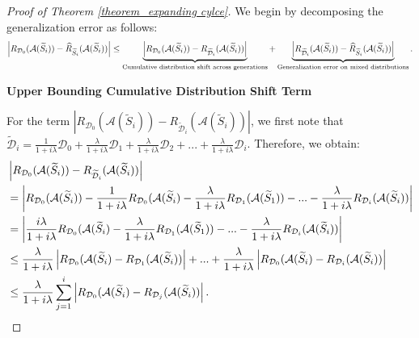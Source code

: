 \begin{proof}[Proof of Theorem \ref{theorem_expanding cylce}]
We begin by decomposing the generalization error as follows:
\begin{align}
\left|R_{\mathcal{D}_0}(\mathcal{A}(\widetilde{S}_i))-\widehat{R}_{\widetilde{S}_i}(\mathcal{A}(\widetilde{S}_i))\right| \leq \underbrace{\left|R_{\mathcal{D}_0}(\mathcal{A}(\widetilde{S}_i))-R_{\widetilde{\mathcal{D}}_i}(\mathcal{A}(\widetilde{S}_i))\right|}_{\text {Cumulative distribution shift across generations}}+\underbrace{\left| R_{\widetilde{\mathcal{D}}_i}(\mathcal{A}(\widetilde{S}_i))-\widehat{R}_{\widetilde{S}_i}(\mathcal{A}(\widetilde{S}_i)) \right|}_{\text {Generalization error on mixed distributions}}. \notag
\end{align}


\textbf{Upper Bounding Cumulative Distribution Shift Term}


For the term $\left|R_{\mathcal{D}_0}(\mathcal{A}(\widetilde{S}_i))-R_{\widetilde{\mathcal{D}}_i}(\mathcal{A}(\widetilde{S}_i))\right|$, we first note that $\widetilde{\mathcal{D}}_i=\frac{1}{1+i\lambda}\mathcal{D}_0+\frac{\lambda}{1+i\lambda} \mathcal{D}_1+\frac{\lambda}{1+i\lambda} \mathcal{D}_2+...+\frac{\lambda}{1+i\lambda} \mathcal{D}_i$. Therefore, we obtain:
\begin{align}
    &\left|R_{\mathcal{D}_0}(\mathcal{A}(\widetilde{S}_i))-R_{\widetilde{\mathcal{D}}_i}(\mathcal{A}(\widetilde{S}_i))\right|\notag \\
    &=\left|R_{\mathcal{D}_0}(\mathcal{A}(\widetilde{S}_i))-\frac{1}{1+i\lambda} R_{\mathcal{D}_0}(\mathcal{A}(\widetilde{S}_i)-\frac{\lambda}{1+i\lambda}R_{\mathcal{D}_1}(\mathcal{A}(\widetilde{S}_1))-...-\frac{\lambda}{1+i\lambda}R_{\mathcal{D}_i}(\mathcal{A}(\widetilde{S}_i))\right| \notag \\
    &=\left|\frac{i\lambda}{1+i\lambda} R_{\mathcal{D}_0}(\mathcal{A}(\widetilde{S}_i)-\frac{\lambda}{1+i\lambda}R_{\mathcal{D}_1}(\mathcal{A}(\widetilde{S}_1))-...-\frac{\lambda}{1+i\lambda}R_{\mathcal{D}_i}(\mathcal{A}(\widetilde{S}_i))\right| \notag \\
    &\leq \frac{\lambda}{1+i\lambda}\left|R_{\mathcal{D}_0}(\mathcal{A}(\widetilde{S}_i)-R_{\mathcal{D}_1}(\mathcal{A}(\widetilde{S}_i))\right|+...+\frac{\lambda}{1+i\lambda}\left|R_{\mathcal{D}_0}(\mathcal{A}(\widetilde{S}_i)-R_{\mathcal{D}_i}(\mathcal{A}(\widetilde{S}_i))\right| \notag\\
    &\leq \frac{\lambda}{1+i\lambda}\sum_{j=1}^i \left|R_{\mathcal{D}_0}(\mathcal{A}(\widetilde{S}_i)-R_{\mathcal{D}_j}(\mathcal{A}(\widetilde{S}_i))\right|.\label{proof4_term1}
\end{align}


\end{proof}

